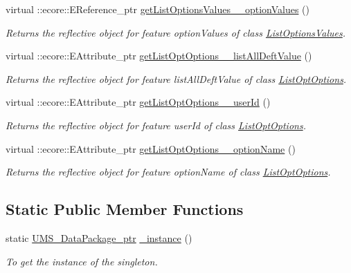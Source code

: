 \begin{DoxyCompactItemize}
virtual ::ecore::EReference\_\-ptr \hyperlink{classUMS__Data_1_1UMS__DataPackage_a977e72ba27da908548d7b31d846ca91e}{getListOptionsValues\_\-\_\-optionValues} ()
\begin{DoxyCompactList}\small\item\em Returns the reflective object for feature optionValues of class \hyperlink{classUMS__Data_1_1ListOptionsValues}{ListOptionsValues}. \item\end{DoxyCompactList}\item 
virtual ::ecore::EAttribute\_\-ptr \hyperlink{classUMS__Data_1_1UMS__DataPackage_afc3aad4e4c19fd44d85b005902429900}{getListOptOptions\_\-\_\-listAllDeftValue} ()
\begin{DoxyCompactList}\small\item\em Returns the reflective object for feature listAllDeftValue of class \hyperlink{classUMS__Data_1_1ListOptOptions}{ListOptOptions}. \item\end{DoxyCompactList}\item 
virtual ::ecore::EAttribute\_\-ptr \hyperlink{classUMS__Data_1_1UMS__DataPackage_a24c1a8a735cdbe177174877453f94f87}{getListOptOptions\_\-\_\-userId} ()
\begin{DoxyCompactList}\small\item\em Returns the reflective object for feature userId of class \hyperlink{classUMS__Data_1_1ListOptOptions}{ListOptOptions}. \item\end{DoxyCompactList}\item 
virtual ::ecore::EAttribute\_\-ptr \hyperlink{classUMS__Data_1_1UMS__DataPackage_a19b8ca396abe163004365cb77dc6041d}{getListOptOptions\_\-\_\-optionName} ()
\begin{DoxyCompactList}\small\item\em Returns the reflective object for feature optionName of class \hyperlink{classUMS__Data_1_1ListOptOptions}{ListOptOptions}. \item\end{DoxyCompactList}\end{DoxyCompactItemize}
\subsection*{Static Public Member Functions}
\begin{DoxyCompactItemize}
\item 
static \hyperlink{classUMS__Data_1_1UMS__DataPackage}{UMS\_\-DataPackage\_\-ptr} \hyperlink{classUMS__Data_1_1UMS__DataPackage_add041c3befcd548aa937cd6bc7efbc18}{\_\-instance} ()
\begin{DoxyCompactList}\small\item\em To get the instance of the singleton. \item\end{DoxyCompactList}\end{DoxyCompactItemize}
